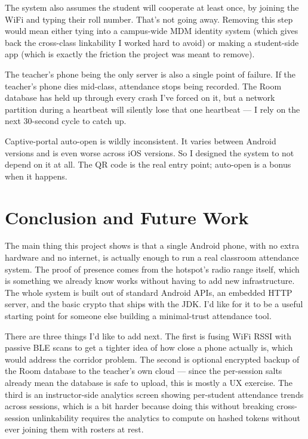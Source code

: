 \documentclass[sigconf,10pt]{acmart}
\begin{document}
The system also assumes the student will cooperate at least once,
by joining the WiFi and typing their roll number. That's not
going away. Removing this step would mean either tying into a
campus-wide MDM identity system (which gives back the cross-class
linkability I worked hard to avoid) or making a student-side app
(which is exactly the friction the project was meant to remove).

The teacher's phone being the only server is also a single point
of failure. If the teacher's phone dies mid-class, attendance
stops being recorded. The Room database has held up through
every crash I've forced on it, but a network partition during a
heartbeat will silently lose that one heartbeat --- I rely on the
next 30-second cycle to catch up.

Captive-portal auto-open is wildly inconsistent. It varies between
Android versions and is even worse across iOS versions. So I
designed the system to not depend on it at all. The QR code is
the real entry point; auto-open is a bonus when it happens.

\section{Conclusion and Future Work}

The main thing this project shows is that a single Android phone,
with no extra hardware and no internet, is actually enough to run
a real classroom attendance system. The proof of presence comes
from the hotspot's radio range itself, which is something we
already know works without having to add new infrastructure. The
whole system is built out of standard Android APIs, an embedded
HTTP server, and the basic crypto that ships with the JDK. I'd
like for it to be a useful starting point for someone else
building a minimal-trust attendance tool.

There are three things I'd like to add next. The first is fusing
WiFi RSSI with passive BLE scans to get a tighter idea of how
close a phone actually is, which would address the corridor
problem. The second is optional encrypted backup of the Room
database to the teacher's own cloud --- since the per-session
salts already mean the database is safe to upload, this is mostly
a UX exercise. The third is an instructor-side analytics screen
showing per-student attendance trends across sessions, which is a
bit harder because doing this without breaking cross-session
unlinkability requires the analytics to compute on hashed tokens
without ever joining them with rosters at rest.
\end{document}
